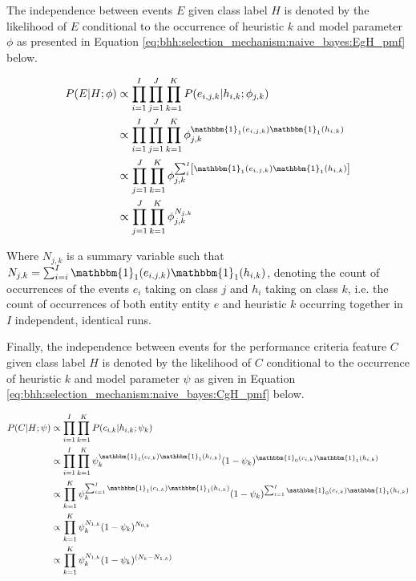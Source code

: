 The independence between events $E$ given class label $H$ is denoted by the likelihood of $E$
conditional to the occurrence of heuristic $k$ and model parameter $\phi$ as
presented in Equation \ref{eq:bhh:selection_mechanism:naive_bayes:EgH_pmf} below.

\begin{equation}
      \label{eq:bhh:selection_mechanism:naive_bayes:EgH_pmf}
      \begin{split}
            P(E \vert H;  \phi)
            &\propto \prod_{i=1}^{I} \prod_{j=1}^{J} \prod_{k=1}^{K} P(e_{i,j,k} \vert h_{i,k} ; \phi_{j,k})  \\
            &\propto \prod_{i=1}^{I} \prod_{j=1}^{J} \prod_{k=1}^{K} \phi_{j,k}^{\mathbbm{1}_{1}(e_{i,j,k})\mathbbm{1}_{1}(h_{i,k})} \\
            &\propto \prod_{j=1}^{J} \prod_{k=1}^{K} \phi_{j,k}^{ \sum_{i}^{I} \left[ \mathbbm{1}_{1}(e_{i,j,k}) \mathbbm{1}_{1}(h_{i,k}) \right]} \\
            &\propto \prod_{j=1}^{J} \prod_{k=1}^{K} \phi_{j,k}^{N_{j,k}}
      \end{split}
\end{equation}

Where $N_{j,k}$ is a summary variable such that $N_{j,k} = \sum_{i=i}^{I}
      \mathbbm{1}_{1}(e_{i,j,k})\mathbbm{1}_{1}(h_{i,k})$, denoting the count of
occurrences of the events $e_{i}$ taking on class $j$ and $h_{i}$ taking on
class $k$, i.e. the count of occurrences of both entity entity $e$ and heuristic
$k$ occurring together in $I$ independent, identical runs.

Finally, the independence between events for the performance criteria feature $C$ given class
label $H$ is denoted by the likelihood of $C$ conditional to the occurrence of
heuristic $k$ and model parameter $\psi$ as given in Equation \ref{eq:bhh:selection_mechanism:naive_bayes:CgH_pmf} below.

\begin{equation}
      \label{eq:bhh:selection_mechanism:naive_bayes:CgH_pmf}
      \begin{split}
            P(C\vert H;  \psi)
            &\propto\prod_{i=1}^{I} \prod_{k=1}^{K} P(c_{i,k} \vert h_{i,k} ; \psi_{k})  \\
            &\propto \prod_{i=1}^{I} \prod_{k=1}^{K} \psi_{k}^{\mathbbm{1}_{1}(c_{i,k})\mathbbm{1}_{1}(h_{i,k})} (1 - \psi_{k})^{\mathbbm{1}_{0}(c_{i,k})\mathbbm{1}_{1}(h_{i,k})}\\
            &\propto \prod_{k=1}^{K} \psi_{k}^{\sum_{i=1}^{I} \mathbbm{1}_{1}(c_{i,k})\mathbbm{1}_{1}(h_{i,k})} (1 - \psi_{k})^{\sum_{i=1}^{I} \mathbbm{1}_{0}(c_{i,k})\mathbbm{1}_{1}(h_{i,k})}\\
            &\propto \prod_{k=1}^{K} \psi_{k}^{N_{1,k}} (1 - \psi_{k})^{N_{0,k}} \\
            &\propto \prod_{k=1}^{K} \psi_{k}^{N_{1,k}} (1 - \psi_{k})^{(N_{k} - N_{1,k})}
      \end{split}
\end{equation}

